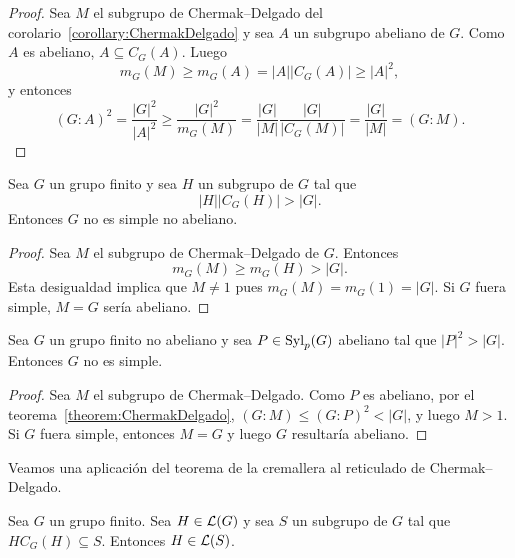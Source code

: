 \begin{proof}
	Sea $M$ el subgrupo de Chermak--Delgado del
	corolario~\ref{corollary:ChermakDelgado} y sea $A$ un subgrupo abeliano de
	$G$.  Como $A$ es abeliano, $A\subseteq C_G(A)$. Luego 
	\[
		m_G(M)\geq m_G(A)=|A||C_G(A)|\geq|A|^2,
	\]
	y entonces
	\[
	(G:A)^2
	=\frac{|G|^2}{|A|^2}\geq\frac{|G|^2}{m_G(M)}
	=\frac{|G|}{|M|}\frac{|G|}{|C_G(M)|}
	=\frac{|G|}{|M|}
	=(G:M).
	\]
\end{proof}

\begin{corollary}
	Sea $G$ un grupo finito y sea $H$ un subgrupo de $G$ tal que
	\[
	|H||C_G(H)|>|G|.
	\]
	Entonces $G$ 
	no es simple no abeliano. 
\end{corollary}

\begin{proof}
	Sea $M$ el subgrupo de Chermak--Delgado de $G$. 
	Entonces 
	\begin{equation}
		\label{equation:mG}
	m_G(M)\geq m_G(H)>|G|.
	\end{equation}
	Esta desigualdad implica que $M\ne1$ pues $m_G(M)=m_G(1)=|G|$. Si $G$ fuera
	simple, $M=G$ sería abeliano. 
\end{proof}

\begin{corollary}
	Sea $G$ un grupo finito no abeliano y sea $P\in\mathrm{Syl}_p(G)$ abeliano tal que
	$|P|^2>|G|$.  Entonces $G$ no es simple.
\end{corollary}

\begin{proof}
	Sea $M$ el subgrupo de Chermak--Delgado.  Como $P$ es abeliano, por el
	teorema~\ref{theorem:ChermakDelgado}, $(G:M)\leq (G:P)^2<|G|$, y luego
	$M>1$. Si $G$ fuera simple, entonces $M=G$ y luego $G$ resultaría abeliano. 
\end{proof}


Veamos una aplicación del teorema de la cremallera al reticulado de
Chermak--Delgado.

\begin{lemma}
	\label{lemma:L(G)L(S)}
	Sea $G$ un grupo finito. Sea $H\in\mathcal{L}(G)$ y sea $S$ un subgrupo de $G$ tal que 
	$HC_G(H)\subseteq S$. Entonces $H\in\mathcal{L}(S)$.
\end{lemma}

